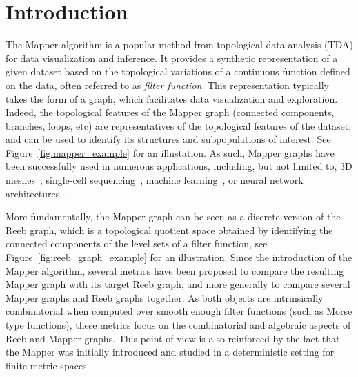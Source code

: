 \section{Introduction}


The Mapper algorithm is a popular method from topological data analysis (TDA) for data visualization and inference. It provides a synthetic representation of a given dataset based on the topological variations of a continuous function defined on the data, often referred to as {\em filter function}. This representation typically takes the form of a graph, which facilitates data visualization and exploration. Indeed, the topological features of the Mapper graph (connected components, branches, loops, etc) are representatives of the topological features of the dataset, and can be used to identify its structures and subpopulations of interest. See Figure~\ref{fig:mapper_example} for an illustation. As such, Mapper graphs have been successfully used in numerous applications, including, but not limited to, 3D meshes~\cite{wang2020exploration,rosen2018inferring}, single-cell sequencing~\cite{wang2018topological,zechel2014topographical},  machine learning~\cite{Bruel-Gabrielsson2018, Naitzat2018}, or neural network architectures~\cite{Mitra21,joseph2021topological}. 

More fundamentally, the Mapper graph can be seen as a discrete version of the Reeb graph, which is a topological quotient space obtained by identifying the connected components of the level sets of a filter function, see Figure~\ref{fig:reeb_graph_example} for an illustration. Since the introduction of the Mapper algorithm, several metrics have been proposed to compare the resulting Mapper graph with its target Reeb graph, and more generally to compare several Mapper graphs and Reeb graphs together. As both objects are intrinsically combinatorial when computed over smooth enough filter functions (such as Morse type functions), %
these metrics focus on the combinatorial and algebraic aspects of Reeb and Mapper graphs. This point of view is also reinforced by the fact that the Mapper was initially introduced and studied in a deterministic setting for finite metric spaces. 

